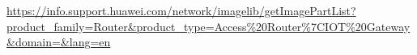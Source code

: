 \newpage

\thispagestyle{empty}


\begin{thebibliography}{a}

\item \url{https://info.support.huawei.com/network/imagelib/getImagePartList?product_family=Router&product_type=Access%20Router%7CIOT%20Gateway&domain=&lang=en}

\end{thebibliography}